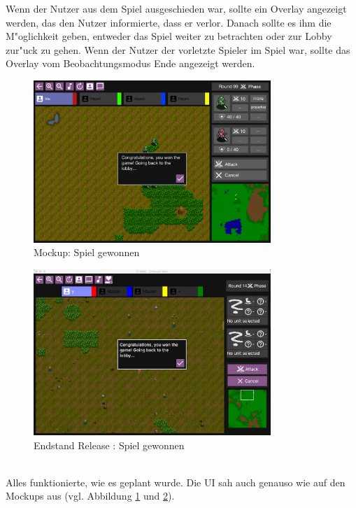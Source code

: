 \documentclass[12pt, titlepage]{scrartcl}
\newcommand{\RN}[1]{%
	\textup{\uppercase\expandafter{\romannumeral#1}}%
}
\newcounter{subsubsubsection}[subsubsection]
\begin{document}
					Wenn der Nutzer aus dem Spiel ausgeschieden war, sollte ein Overlay angezeigt werden, das den Nutzer informierte, dass er verlor. Danach sollte es ihm die M"oglichkeit geben, entweder das Spiel weiter zu betrachten oder zur Lobby zur"uck zu gehen. Wenn der Nutzer der vorletzte Spieler im Spiel war, sollte das Overlay vom Beobachtungsmodus Ende angezeigt werden.
					\begin{figure}[H] 
						\centering
						\includegraphics[width=0.8\textwidth]{images/mockups/GameWon.png}
						\caption{Mockup: Spiel gewonnen}
						\label{Game_Won_2}
					\end{figure}
					\begin{figure}[H] 
						\centering
						\includegraphics[width=0.8\textwidth]{images/endOfRelease/GameWon.png}
						\caption{Endstand Release \RN{3}: Spiel gewonnen}
						\label{End_Game_Won}
					\end{figure}
					\ \\ Alles funktionierte, wie es geplant wurde. Die UI sah auch genauso wie auf den Mockups aus (vgl. Abbildung \ref{Game_Won_2} und \ref{End_Game_Won}).
\end{document}
